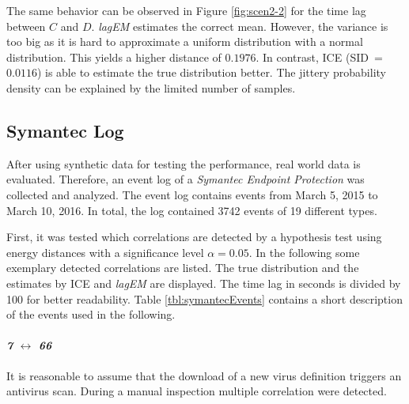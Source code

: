 \documentclass[conference]{IEEEtran}
\theoremstyle{examplestyle}
\begin{document}
The same behavior can be observed in Figure \ref{fig:scen2-2} for the time lag between \(C\) and \(D\). \textit{lagEM} estimates the correct mean. However, the variance is too big as it is hard to approximate a uniform distribution with a normal distribution. This yields a higher distance of $0.1976$. In contrast, \ac{ICE} (\ac{SID}~=~$0.0116$) is able to estimate the true distribution better. The jittery probability density can be explained by the limited number of samples.









\subsection{Symantec Log}
\label{sec:symantecLog}

After using synthetic data for testing the performance, real world data is evaluated. Therefore, an event log of a \textit{Symantec Endpoint Protection} was collected and analyzed. The event log contains events from March 5, 2015 to March 10, 2016. In total, the log contained 3742 events of 19 different types.



First, it was tested which correlations are detected by a hypothesis test using energy distances with a significance level \(\alpha = 0.05\). In the following some exemplary detected correlations are listed. The true distribution and the estimates by \ac{ICE} and \textit{lagEM} are displayed. The time lag in seconds is divided by 100 for better readability. Table \ref{tbl:symantecEvents} contains a short description of the events used in the following.


\paragraph{\textit{7} \(\leftrightarrow\) \textit{66}} It is reasonable to assume that the download of a new virus definition triggers an antivirus scan. During a manual inspection multiple correlation were detected.
\end{document}
